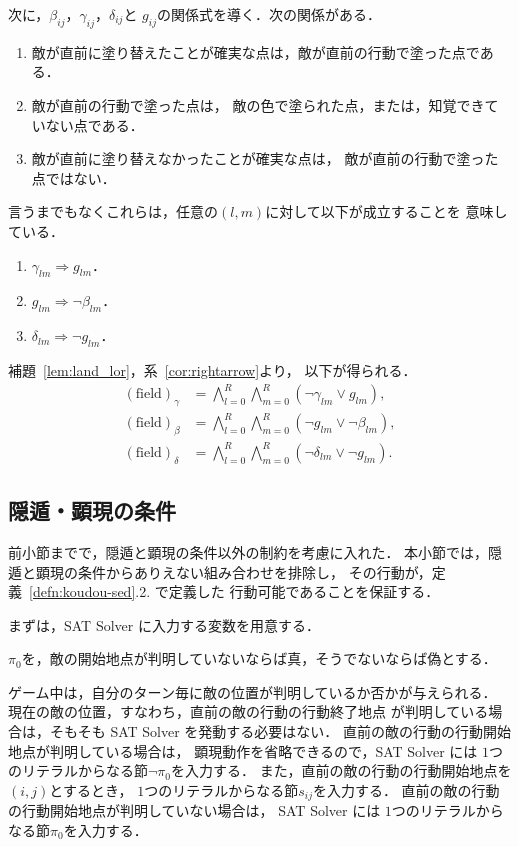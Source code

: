 次に，$\beta_{ij}$，$\gamma_{ij}$，$\delta_{ij}$と
$g_{ij}$の関係式を導く．次の関係がある．
\begin{enumerate}
 \item 敵が直前に塗り替えたことが確実な点は，敵が直前の行動で塗った点である．
 \item 敵が直前の行動で塗った点は，
       敵の色で塗られた点，または，知覚できていない点である．
 \item 敵が直前に塗り替えなかったことが確実な点は，
       敵が直前の行動で塗った点ではない．
\end{enumerate}
言うまでもなくこれらは，任意の$(l, m)$に対して以下が成立することを
意味している．
\begin{enumerate}
 \item $\gamma_{lm} \Rightarrow g_{lm}$．
 \item $g_{lm} \Rightarrow \lnot \beta_{lm}$．
 \item $\delta_{lm} \Rightarrow \lnot g_{lm}$．
\end{enumerate}
補題~\ref{lem:land_lor}，系~\ref{cor:rightarrow}より，
以下が得られる．
\begin{align*}
 (\text{field})_\gamma &=
 \bigwedge_{l = 0}^R  \bigwedge_{m = 0}^R (\lnot \gamma_{lm} \lor
 g_{lm}), \\
 (\text{field})_\beta &=
 \bigwedge_{l = 0}^R  \bigwedge_{m = 0}^R (\lnot g_{lm} \lor
 \lnot \beta_{lm}), \\
 (\text{field})_\delta &=
 \bigwedge_{l = 0}^R  \bigwedge_{m = 0}^R (\lnot \delta_{lm} \lor
 \lnot g_{lm}).
\end{align*}

\subsection{隠遁・顕現の条件}

前小節までで，隠遁と顕現の条件以外の制約を考慮に入れた．
本小節では，隠遁と顕現の条件からありえない組み合わせを排除し，
その行動が，定義~\ref{defn:koudou-sed}.2. で定義した
行動可能であることを保証する．

まずは，SAT Solver に入力する変数を用意する．

\begin{nota} \label{nota:pi}
 $\pi_0$を，敵の開始地点が判明していないならば真，そうでないならば偽とする．
\end{nota}

\begin{rem}
 ゲーム中は，自分のターン毎に敵の位置が判明しているか否かが与えられる．
 現在の敵の位置，すなわち，直前の敵の行動の行動終了地点
 が判明している場合は，そもそも
 SAT Solver を発動する必要はない．
 直前の敵の行動の行動開始地点が判明している場合は，
 顕現動作を省略できるので，SAT Solver には
 $1$つのリテラルからなる節$\lnot \pi_0$を入力する．
 また，直前の敵の行動の行動開始地点を$(i, j)$とするとき，
 $1$つのリテラルからなる節$s_{ij}$を入力する．
 直前の敵の行動の行動開始地点が判明していない場合は，
 SAT Solver には
 $1$つのリテラルからなる節$\pi_0$を入力する．
\end{rem}

